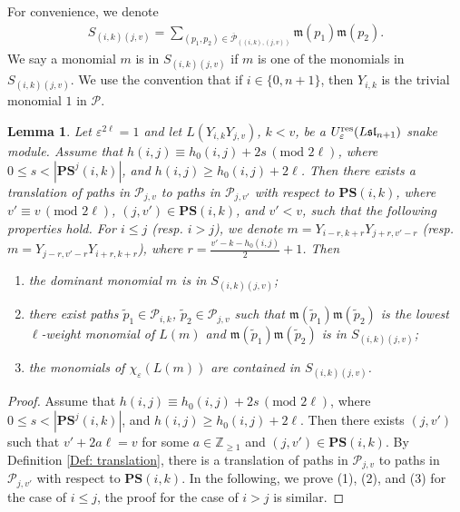 \documentclass[12pt, reqno]{amsart}
\newtheorem{lemma}[theorem]{Lemma}
\numberwithin{equation}{section}
\newcommand{\res}{{\rm res}}
\begin{document}
{For convenience, we denote
\begin{align}\label{Eq:abbreviation for non-overlapping paths}
S_{(i,k)(j,v)} = \sum_{(p_{1},p_{2}) \in \overline{\mathscr{P}}_{((i,k),(j,v))}}\mathfrak{m}(p_1)\mathfrak{m}(p_2).
\end{align}
We say a monomial $m$ is in $S_{(i,k)(j,v)}$ if $m$ is one of the monomials in $S_{(i,k)(j,v)}$. We use the convention that if $i\in \{0, n+1\}$, then $Y_{i,k}$ is the trivial monomial $1$ in $\mathcal{P}$.

\begin{lemma}\label{Le: I translation of degree 2}
Let $\varepsilon^{2 \ell}=1$ and let $L(Y_{i,k}Y_{j,v})$, $k<v$, be a $U_{\varepsilon}^{\res}({L\mathfrak{sl}_{n+1}})$ snake module. Assume that $h(i,j)\equiv h_{0}(i,j)+2s \,(\text{mod } 2 \ell)$, where $0\leq s<|\mathbf{PS}^{j}(i,k)|$, and $h(i,j)\geq h_{0}(i,j)+2 \ell$. Then there exists a translation of paths in $\mathscr{P}_{j,v}$ to paths in $\mathscr{P}_{j,v'}$ with respect to $\mathbf{PS}(i,k)$, where $v'\equiv v \, (\text{mod } 2 \ell)$, $(j,v')\in \mathbf{PS}(i,k)$, and $v'< v$, such that the following properties hold. For $i\leq j$ (resp. $i>j$), we denote $m=Y_{i-r,k+r}Y_{j+r,v'-r}$ (resp. $m=Y_{j-r,v'-r}Y_{i+r,k+r}$), where $r=\frac{v'-k-h_0(i,j)}2+1$. Then
\begin{enumerate}
    \item the dominant monomial $m$ is in $S_{(i,k)(j,v)}$;
    \item there exist paths $\widetilde{p}_1 \in \mathscr{P}_{i,k}$, $\widetilde{p}_2\in \mathscr{P}_{j,v}$ such that $\mathfrak{m}(\widetilde{p}_1)\mathfrak{m}(\widetilde{p}_2)$ is the lowest $\ell$-weight monomial of $L(m)$ and $\mathfrak{m}(\widetilde{p}_1)\mathfrak{m}(\widetilde{p}_2)$ is in $S_{(i,k)(j,v)}$;
    \item the monomials of $\chi_\varepsilon(L(m))$ are contained in $S_{(i,k)(j,v)}$. 
\end{enumerate}
\end{lemma}

\begin{proof}
Assume that $h(i,j)\equiv h_{0}(i,j)+2s \,(\text{mod } 2 \ell)$, where $0\leq s<|\mathbf{PS}^{j}(i,k)|$, and $h(i,j)\geq h_{0}(i,j)+2 \ell$. Then there exists $(j,v')$ such that $v'+2a \ell= v$ for some $a\in \mathbb{Z}_{\geq 1}$ and $(j,v')\in \mathbf{PS}(i,k)$. By Definition \ref{Def: translation}, there is a translation of paths in $\mathscr{P}_{j,v}$ to paths in $\mathscr{P}_{j,v'}$ with respect to $\mathbf{PS}(i,k)$. In the following, we prove (1), (2), and (3) for the case of $i\leq j$, the proof for the case of $i>j$ is similar.


\end{proof}}
\end{document}
